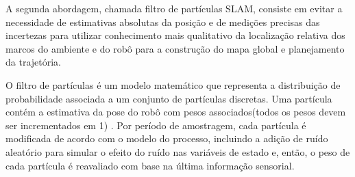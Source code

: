 A segunda abordagem, chamada filtro de partículas SLAM, consiste em evitar a necessidade de estimativas absolutas da
posição e de medições precisas das incertezas para utilizar conhecimento mais qualitativo da
localização relativa dos marcos do ambiente e do robô para a construção do mapa global e
planejamento da trajetória\cite{construcaoMapas}. 

O filtro de partículas é um modelo matemático que representa a distribuição de probabilidade associada a um conjunto 
de partículas discretas. Uma partícula contém a estimativa da pose do robô com pesos associados(todos os pesos 
devem ser incrementados em 1) \cite{slam2}. Por período de amostragem, cada partícula é modificada de acordo com o
modelo do processo, incluindo a adição de ruído aleatório para simular o efeito do ruído
nas variáveis de estado e, então, o peso de cada partícula é reavaliado com base na última
informação sensorial. 

